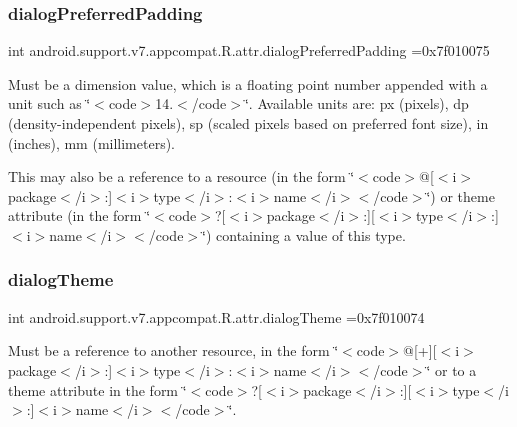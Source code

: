 \subsubsection{\texorpdfstring{dialog\+Preferred\+Padding}{dialogPreferredPadding}}
{\footnotesize\ttfamily int android.\+support.\+v7.\+appcompat.\+R.\+attr.\+dialog\+Preferred\+Padding =0x7f010075\hspace{0.3cm}{\ttfamily [static]}}

Must be a dimension value, which is a floating point number appended with a unit such as \char`\"{}$<$code$>$14.\+5sp$<$/code$>$\char`\"{}. Available units are\+: px (pixels), dp (density-\/independent pixels), sp (scaled pixels based on preferred font size), in (inches), mm (millimeters). 

This may also be a reference to a resource (in the form \char`\"{}$<$code$>$@\mbox{[}$<$i$>$package$<$/i$>$\+:\mbox{]}$<$i$>$type$<$/i$>$\+:$<$i$>$name$<$/i$>$$<$/code$>$\char`\"{}) or theme attribute (in the form \char`\"{}$<$code$>$?\mbox{[}$<$i$>$package$<$/i$>$\+:\mbox{]}\mbox{[}$<$i$>$type$<$/i$>$\+:\mbox{]}$<$i$>$name$<$/i$>$$<$/code$>$\char`\"{}) containing a value of this type. \mbox{\label{classandroid_1_1support_1_1v7_1_1appcompat_1_1R_1_1attr_a28476f24cdf79d9dc7f352e4daf95ecf}} 
\subsubsection{\texorpdfstring{dialog\+Theme}{dialogTheme}}
{\footnotesize\ttfamily int android.\+support.\+v7.\+appcompat.\+R.\+attr.\+dialog\+Theme =0x7f010074\hspace{0.3cm}{\ttfamily [static]}}

Must be a reference to another resource, in the form \char`\"{}$<$code$>$@\mbox{[}+\mbox{]}\mbox{[}$<$i$>$package$<$/i$>$\+:\mbox{]}$<$i$>$type$<$/i$>$\+:$<$i$>$name$<$/i$>$$<$/code$>$\char`\"{} or to a theme attribute in the form \char`\"{}$<$code$>$?\mbox{[}$<$i$>$package$<$/i$>$\+:\mbox{]}\mbox{[}$<$i$>$type$<$/i$>$\+:\mbox{]}$<$i$>$name$<$/i$>$$<$/code$>$\char`\"{}. \mbox{\label{classandroid_1_1support_1_1v7_1_1appcompat_1_1R_1_1attr_adc627bc21e2b2c5f1a2d582b13ddd6ca}} 
